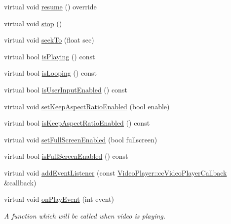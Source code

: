 \begin{DoxyCompactItemize}
\item 
virtual void \hyperlink{classexperimental_1_1ui_1_1VideoPlayer_a729841b1854104223900a8f6c711040a}{resume} () override
\item 
virtual void \hyperlink{classexperimental_1_1ui_1_1VideoPlayer_a1f0ecb61a2f7860525be697832cb6b8d}{stop} ()
\item 
virtual void \hyperlink{classexperimental_1_1ui_1_1VideoPlayer_ad08fd0814f311ac160b5f0eab4e3009a}{seek\+To} (float sec)
\item 
virtual bool \hyperlink{classexperimental_1_1ui_1_1VideoPlayer_acc07be3ef6a4b2b639f9eb44d8c8f7d1}{is\+Playing} () const
\item 
virtual bool \hyperlink{classexperimental_1_1ui_1_1VideoPlayer_a8b375ef4829ef04e022a9e7d0ada24aa}{is\+Looping} () const
\item 
virtual bool \hyperlink{classexperimental_1_1ui_1_1VideoPlayer_a6fe34ddb8d9cb2774d9097ff1ea68c47}{is\+User\+Input\+Enabled} () const
\item 
virtual void \hyperlink{classexperimental_1_1ui_1_1VideoPlayer_a0421f619865f1ba5978e9cfbaf73e1e8}{set\+Keep\+Aspect\+Ratio\+Enabled} (bool enable)
\item 
virtual bool \hyperlink{classexperimental_1_1ui_1_1VideoPlayer_af3bf649848afacd0efd84e06656f2828}{is\+Keep\+Aspect\+Ratio\+Enabled} () const
\item 
virtual void \hyperlink{classexperimental_1_1ui_1_1VideoPlayer_ab22336427d46be866e023e5b57f5fe68}{set\+Full\+Screen\+Enabled} (bool fullscreen)
\item 
virtual bool \hyperlink{classexperimental_1_1ui_1_1VideoPlayer_ab2381455eeb422dc2872dc4bd7613e70}{is\+Full\+Screen\+Enabled} () const
\item 
virtual void \hyperlink{classexperimental_1_1ui_1_1VideoPlayer_a5c8ddd1fd32da63de5c88bf0570b10df}{add\+Event\+Listener} (const \hyperlink{classexperimental_1_1ui_1_1VideoPlayer_a64ebf250429fec0efea303b13cecf02e}{Video\+Player\+::cc\+Video\+Player\+Callback} \&callback)
\item 
virtual void \hyperlink{classexperimental_1_1ui_1_1VideoPlayer_a76314bbf716a9b8685257c70fce7115f}{on\+Play\+Event} (int event)
\begin{DoxyCompactList}\small\item\em A function which will be called when video is playing. \end{DoxyCompactList}\item 
\mbox{\label{classexperimental_1_1ui_1_1VideoPlayer_a985e80592c90bf48352d8d1e8f80e6db}} 

\end{DoxyCompactItemize}
